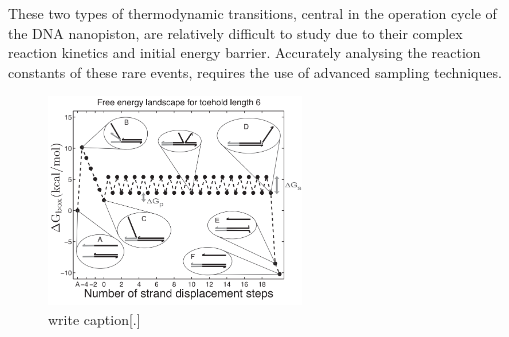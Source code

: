 These two types of thermodynamic transitions, central in the operation cycle of the DNA
nanopiston, are relatively difficult to study due to their complex reaction kinetics and
initial energy barrier. Accurately analysing the reaction constants of these rare events,
requires the use of advanced sampling techniques.

\begin{figure}[ht]
\begin{center}
  \includegraphics[width=0.6\textwidth]{Figures/ToeholdDiagram.png}
  \caption{write caption[.]}
\end{center}
\end{figure}


